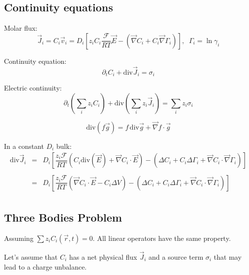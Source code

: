 \documentclass[aps,12pt]{revtex4}
\begin{document}
\subsection{Continuity equations}

Molar flux:
\begin{equation}
	\vec{J}_i = C_i \vec{v}_i = D_i \left[z_i C_i  \dfrac{\mathcal{F}}{RT} \vec{E} - \left(\vec{\nabla} C_i + C_i \vec{\nabla}\Gamma_i\right) \right],\;\;\Gamma_i = \ln \gamma_i
\end{equation}

Continuity equation:
\begin{equation}
	\partial_t C_i + \mathrm{div} \vec{J}_i = \sigma_i
\end{equation}

Electric continuity:
\begin{equation}
	\partial_t \left(\sum_i z_i C_i\right) + \mathrm{div} \left(\sum_i z_i \vec{J}_i\right) = \sum_i z_i \sigma_i
\end{equation}


\begin{equation}
	\mathrm{div}(f\vec{g}) = f \, \mathrm{div}\vec{g} + \vec{\nabla} f \cdot \vec{g}
\end{equation}

In a constant $D_i$ bulk:
\begin{equation}
\begin{array}{rcl}
\mathrm{div} \vec{J}_i & = & D_i \left[ \dfrac{z_i\mathcal{F}}{RT} 
\left(C_i \mathrm{div}\left(\vec{E}\right) + \vec{\nabla} C_i \cdot \vec{E} \right) 
- \left( \Delta C_i + C_i \Delta \Gamma_i + \vec{\nabla} C_i \cdot \vec{\nabla} \Gamma_i \right)
\right]\\
\\
 & = &  D_i \left[ \dfrac{z_i\mathcal{F}}{RT} 
\left(  \vec{\nabla} C_i \cdot \vec{E} - C_i \Delta V \right) 
- \left( \Delta C_i + C_i \Delta \Gamma_i + \vec{\nabla} C_i \cdot \vec{\nabla} \Gamma_i \right)
\right]\\
\end{array}
\end{equation}

\subsection{Three Bodies Problem}

 	
Assuming $\sum z_i C_i(\vec{r},t) = 0$. All linear operators have the same property.

Let's assume that $C_i$ has a net physical flux $\vec{J}_i$ and a source term $\sigma_i$ that may lead to a charge unbalance.
\end{document}
